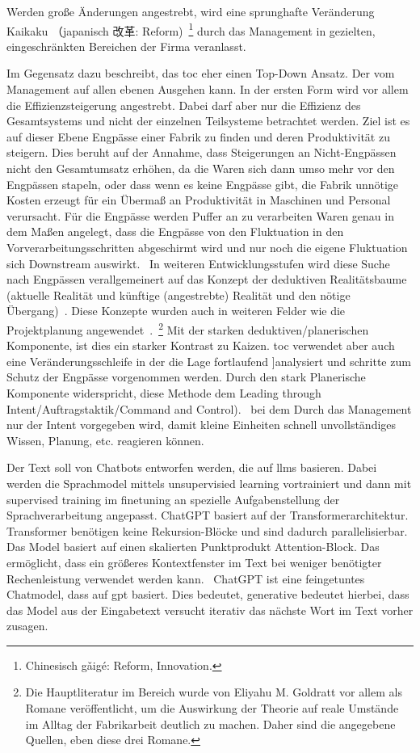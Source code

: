 \documentclass[acmlarge,authorversion,nonacm]{acmart}
\begin{document}
Werden große Änderungen angestrebt, wird eine sprunghafte Veränderung Kaikaku （japanisch 改革: Reform)~\footnote{Chinesisch gǎigé: Reform, Innovation.} durch das Management in gezielten, eingeschränkten Bereichen der Firma veranlasst.

Im Gegensatz dazu beschreibt, das \gls{toc} eher einen Top-Down Ansatz. Der vom Management auf allen ebenen Ausgehen kann. In der ersten Form wird vor allem die Effizienzsteigerung angestrebt. Dabei darf aber nur die Effizienz des Gesamtsystems und nicht der einzelnen Teilsysteme betrachtet werden. Ziel ist es auf dieser Ebene Engpässe einer Fabrik zu finden und deren Produktivität zu steigern. Dies beruht auf der Annahme, dass Steigerungen an Nicht-Engpässen nicht den Gesamtumsatz erhöhen, da die Waren sich dann umso mehr vor den Engpässen stapeln, oder dass wenn es keine Engpässe gibt, die Fabrik unnötige Kosten erzeugt für ein Übermaß an Produktivität in Maschinen und Personal verursacht. Für die Engpässe werden Puffer an zu verarbeiten Waren genau in dem Maßen angelegt, dass die Engpässe von den Fluktuation in den Vorverarbeitungsschritten abgeschirmt wird und nur noch die eigene Fluktuation sich Downstream auswirkt.~\cite{goldratt_goal_2012} In weiteren Entwicklungsstufen wird diese Suche nach Engpässen verallgemeinert auf das Konzept der deduktiven Realitätsbaume (aktuelle Realität und künftige (angestrebte) Realität und den nötige Übergang)~\cite{goldratt_its_2011}. Diese Konzepte wurden auch in weiteren Felder wie die Projektplanung angewendet~\cite{goldratt_critical_2002}.~\footnote{Die Hauptliteratur im Bereich wurde von Eliyahu M. Goldratt vor allem als Romane veröffentlicht, um die Auswirkung der Theorie auf reale Umstände im Alltag der Fabrikarbeit deutlich zu machen. Daher sind die angegebene Quellen, eben diese drei Romane.} Mit der starken deduktiven/planerischen Komponente, ist dies ein starker Kontrast zu Kaizen. \gls{toc} verwendet aber auch eine Veränderungsschleife in der die Lage fortlaufend ]analysiert und schritte zum Schutz der Engpässe vorgenommen werden. Durch den stark  Planerische Komponente widerspricht, diese Methode dem Leading through Intent/Auftragstaktik/Command and Control).~\cite{bungay_art_2011} bei dem Durch das Management nur der Intent vorgegeben wird, damit kleine Einheiten schnell unvollständiges Wissen, Planung, etc. reagieren können.


Der Text soll von Chatbots entworfen werden, die auf \glspl{llm} basieren.
Dabei werden die Sprachmodel mittels unsupervisied learning vortrainiert und dann mit supervised training im finetuning an spezielle Aufgabenstellung der Sprachverarbeitung angepasst. ChatGPT basiert auf der Transformerarchitektur. Transformer benötigen keine Rekursion-Blöcke und sind dadurch parallelisierbar. Das Model basiert auf einen skalierten Punktprodukt Attention-Block. Das ermöglicht, dass ein größeres Kontextfenster im Text bei weniger benötigter Rechenleistung verwendet werden kann.~\cite{vaswani_attention_2023} ChatGPT ist eine feingetuntes Chatmodel, dass auf \gls{gpt} basiert.
Dies bedeutet, generative bedeutet hierbei, dass das Model aus der Eingabetext versucht iterativ das nächste Wort im Text vorher zusagen.~\cite{raschka_build_2025}
\end{document}
